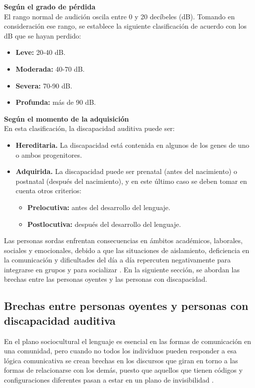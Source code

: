 \newpage
\textbf{Según el grado de pérdida}\\
El rango normal de audición oscila entre 0 y 20 decíbeles (dB). Tomando en consideración ese rango, se establece la siguiente clasificación de acuerdo con los dB que se hayan perdido:

\begin{itemize}
    \item \textbf{Leve:} 20-40 dB.  
    \item \textbf{Moderada:} 40-70 dB.  
    \item \textbf{Severa:} 70-90 dB.  
    \item \textbf{Profunda:} más de 90 dB.  
\end{itemize}

\textbf{Según el momento de la adquisición}\\
En esta clasificación, la discapacidad auditiva puede ser:

\begin{itemize}
    \item \textbf{Hereditaria.} La discapacidad está contenida en algunos de los genes de uno o ambos progenitores.  
    \item \textbf{Adquirida.} La discapacidad puede ser prenatal (antes del nacimiento) o postnatal (después del nacimiento), y en este último caso se deben tomar en cuenta otros criterios:
        \begin{itemize}
        \item \textbf{Prelocutiva:} antes del desarrollo del lenguaje.  
        \item \textbf{Postlocutiva:} después del desarrollo del lenguaje.  
        \end{itemize}
    \end{itemize}

Las personas sordas enfrentan consecuencias en ámbitos académicos, laborales, sociales y emocionales, debido a que las situaciones de aislamiento, deficiencia en la comunicación y dificultades del día a día repercuten negativamente para integrarse en grupos y para socializar \cite{ref29}. En la siguiente sección, se abordan las brechas entre las personas oyentes y las personas con discapacidad.

\subsection{Brechas entre personas oyentes y personas con discapacidad auditiva}
En el plano sociocultural el lenguaje es esencial en las formas de comunicación en una comunidad, pero cuando no todos los individuos pueden responder a esa lógica comunicativa se crean brechas en los discursos que giran en torno a las formas de relacionarse con los demás, puesto que aquellos que tienen códigos y configuraciones diferentes pasan a estar en un plano de invisibilidad \cite{ref32}.\\

